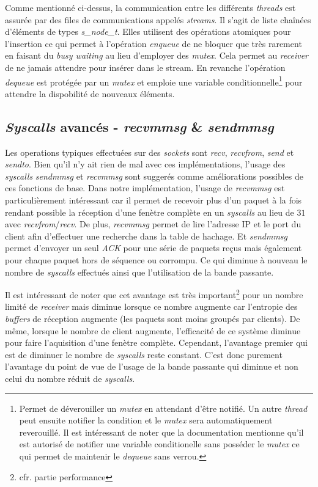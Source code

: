 \documentclass[../main.tex]{subfiles}
\begin{document}
Comme mentionné ci-dessus, la communication entre les différents \textit{threads} est assurée par des files de communications appelés \textit{streams}.
Il s'agit de liste chaînées d'éléments de types \textit{s\_node\_t}. Elles utilisent des opérations atomiques pour l'insertion ce qui permet
à l'opération \textit{enqueue} de ne bloquer que très rarement en faisant du \textit{busy waiting} au lieu d'employer des \textit{mutex}. Cela permet
au \textit{receiver} de ne jamais attendre pour insérer dans le stream. En revanche l'opération \textit{dequeue} est protégée par un \textit{mutex} et
emploie une variable conditionnelle\footnote{ Permet de déverouiller un \textit{mutex} en attendant d'être notifié. Un autre \textit{thread} peut ensuite notifier
la condition et le \textit{mutex} sera automatiquement reverouillé. Il est intéressant de noter que la documentation mentionne qu'il est autorisé
de notifier une variable conditionelle sans posséder le \textit{mutex} ce qui permet de maintenir le \textit{dequeue} sans verrou. } pour attendre la dispobilité de nouveaux éléments.

\subsection{\textit{Syscalls} avancés - \textit{recvmmsg} \& \textit{sendmmsg}}
\label{sec:syscalls}

Les operations typiques effectuées sur des \textit{sockets} sont \textit{recv}, \textit{recvfrom}, \textit{send} et \textit{sendto}. Bien qu'il n'y ait rien
de mal avec ces implémentations, l'usage des \textit{syscalls} \textit{sendmmsg} et \textit{recvmmsg} sont suggerés comme améliorations possibles\cite{that_awesome_paper}
de ces fonctions de base. Dans notre implémentation, l'usage de \textit{recvmmsg} est particulièrement intéressant car il permet de recevoir plus d'un paquet à la fois
rendant possible la réception d'une fenètre complète en un \textit{syscalls} au lieu de $31$ avec \textit{recvfrom}/\textit{recv}. De plus, \textit{recvmmsg} permet
de lire l'adresse IP et le port du client afin d'effectuer une recherche dans la table de hachage. Et \textit{sendmmsg} permet d'envoyer un seul \textit{ACK} pour
une série de paquets reçus mais également pour chaque paquet hors de séquence ou corrompu. Ce qui diminue à nouveau le nombre de \textit{syscalls} effectués ainsi que 
l'utilisation de la bande passante.

Il est intéressant de noter que cet avantage est très important\footnote{ cfr. partie performance} pour un nombre limité de \textit{receiver} mais diminue lorsque  
ce nombre augmente car l'entropie des \textit{buffers} de réception augmente (les paquets sont moins groupés par clients). De même, lorsque le nombre de client augmente,
 l'efficacité de ce système diminue pour faire l'aquisition d'une fenètre complète. Cependant, l'avantage premier qui est de diminuer le nombre de \textit{syscalls} 
 reste constant. C'est donc purement l'avantage du point de vue de l'usage de la bande passante qui diminue et non celui du nombre réduit de \textit{syscalls}. 
\end{document}
